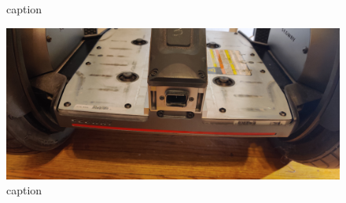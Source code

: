 \documentclass[]{formalLabReport}
\begin{document}
\begin{figure}
    \caption{caption}
    \label{fig:segwayPadsRemoved.jpg}
\end{figure}

\begin{figure}
    \includegraphics[]{segwayRear.jpg}
    \caption{caption}
    \label{fig:segwayRear.jpg}
\end{figure}
\end{document}
